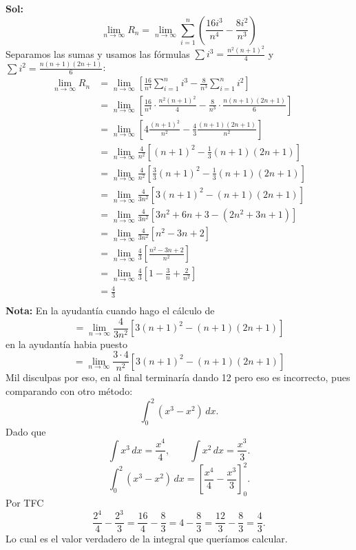 \documentclass[letterpaper,12pt]{article}
\theoremstyle{plain}
\theoremstyle{definition}
\begin{document}
\begin{enumerate}
\begin{itemize}
        
\color{blue}
\textbf{Sol:} $$
\lim_{n \to \infty} R_n = \lim_{n \to \infty} \sum_{i=1}^{n} \left( \frac{16i^3}{n^4} - \frac{8i^2}{n^3} \right)
$$
Separamos las sumas y usamos las fórmulas $\sum i^3 = \frac{n^2(n+1)^2}{4}$ y $\sum i^2 = \frac{n(n+1)(2n+1)}{6}$:
\begin{align*}
\lim_{n \to \infty} R_n &= \lim_{n \to \infty} \left[ \frac{16}{n^4} \sum_{i=1}^{n} i^3 - \frac{8}{n^3} \sum_{i=1}^{n} i^2 \right] \\
&= \lim_{n \to \infty} \left[ \frac{16}{n^4} \cdot \frac{n^2(n+1)^2}{4} - \frac{8}{n^3} \cdot \frac{n(n+1)(2n+1)}{6} \right] \\
&= \lim_{n \to \infty} \left[ 4 \frac{(n+1)^2}{n^2} - \frac{4}{3} \frac{(n+1)(2n+1)}{n^2} \right] \\
&= \lim_{n \to \infty} \frac{4}{n^2}\left[  (n+1)^2 - \frac{1}{3} (n+1)(2n+1) \right] \\
&= \lim_{n \to \infty} \frac{4}{n^2}\left[ \frac{3}{3} (n+1)^2 - \frac{1}{3} (n+1)(2n+1) \right] \\
&= \lim_{n \to \infty} \frac{4}{3n^2}\left[  3(n+1)^2 -(n+1)(2n+1) \right] \\
&= \lim_{n \to \infty} \frac{4}{3n^2}\left[  3n^2+6n+3 -(2n^2+3n+1) \right] \\
&= \lim_{n \to \infty} \frac{4}{3n^2}\left[  n^2-3n+2 \right] \\
&= \lim_{n \to \infty} \frac{4}{3}\left[  \frac{n^2-3n+2}{n^2} \right] \\
&= \lim_{n \to \infty} \frac{4}{3}\left[  1-\frac{3}{n}+\frac{2}{n^2} \right] \\
&= \frac{4}{3} \\
\end{align*}
\textbf{Nota:} En la ayudantía cuando hago el cálculo de 
$$
= \lim_{n \to \infty} \frac{4}{3n^2}\left[  3(n+1)^2 -(n+1)(2n+1) \right]
$$
en la ayudantía habia puesto
$$= \lim_{n \to \infty} \frac{3\cdot4}{n^2}\left[  3(n+1)^2 -(n+1)(2n+1) \right] $$
Mil disculpas por eso, en al final terminaría dando 12 pero eso es incorrecto, pues comparando con otro método:
\[
\int_0^2 (x^3 - x^2)\,dx.
\]
Dado que
\[
\int x^3\,dx = \frac{x^4}{4}, 
\qquad
\int x^2\,dx = \frac{x^3}{3}.
\]
\[
\int_0^2 (x^3 - x^2)\,dx
=
\left[ \frac{x^4}{4} - \frac{x^3}{3} \right]_0^2.
\]
Por TFC
\[
\frac{2^4}{4} - \frac{2^3}{3}
= \frac{16}{4} - \frac{8}{3}
= 4 - \frac{8}{3}
= \frac{12}{3} - \frac{8}{3}
= \frac{4}{3}.
\]
Lo cual es el valor verdadero de la integral que queríamos calcular.
\color{black}




\end{itemize}
\end{enumerate}
\end{document}
